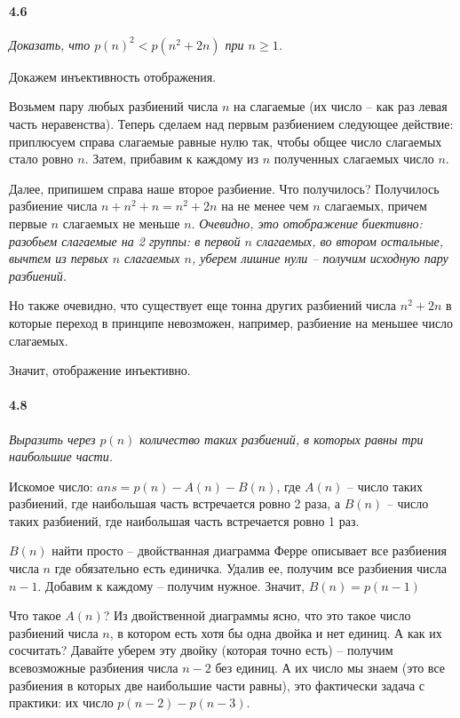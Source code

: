\documentclass[russian]{article}
\begin{document}
\paragraph*{4.6}

\textit{Доказать, что $p(n)^2 < p(n^2 + 2n)$ при $n \geqslant 1$. }

Докажем инъективность отображения.

Возьмем пару любых разбиений числа $n$ на слагаемые (их число -- как раз левая часть неравенства). Теперь сделаем над первым разбиением следующее действие:  приплюсуем справа слагаемые равные нулю так, чтобы общее число слагаемых стало ровно $n$. Затем, прибавим к каждому из $n$ полученных слагаемых число $n$. 


Далее, припишем справа наше второе разбиение. Что получилось? Получилось разбиение числа $n + n^2 + n = n^2 + 2n$ на не менее чем $n$ слагаемых, причем первые $n$ слагаемых не меньше $n$. \textit{Очевидно, это отображение биективно: разобьем слагаемые на 2 группы: в первой $n$ слагаемых, во втором остальные, вычтем из первых $n$ слагаемых $n$, уберем лишние нули -- получим исходную пару разбиений.}

Но также очевидно, что существует еще тонна других разбиений числа $n^2+2n$ в которые переход в принципе невозможен, например, разбиение на меньшее число слагаемых. 

Значит, отображение инъективно.

\paragraph*{4.8}

\textit{Выразить через $p(n)$ количество таких разбиений, в которых равны три наибольшие части.}

Искомое число: $ans = p(n) - A(n) - B(n)$, где $A(n)$ -- число таких разбиений, где наибольшая часть встречается ровно 2 раза, а $B(n)$ -- число таких разбиений, где наибольшая часть встречается ровно 1 раз.


$B(n)$ найти просто -- двойстванная диаграмма Ферре описывает все разбиения числа $n$ где обязательно есть единичка. Удалив ее, получим все разбиения числа  $n-1$. Добавим к каждому -- получим нужное. Значит, $B(n) = p(n-1)$


Что такое $A(n)$? Из двойственной диаграммы ясно, что это такое число разбиений числа $n$, в котором есть хотя бы одна двойка и нет единиц. А как их сосчитать? Давайте уберем эту двойку (которая точно есть) -- получим всевозможные разбиения числа $n-2$ без единиц. А их число мы знаем (это все разбиения в которых две наибольшие части равны), это фактически задача с практики: их число $p(n-2) - p(n-3)$.
\end{document}
